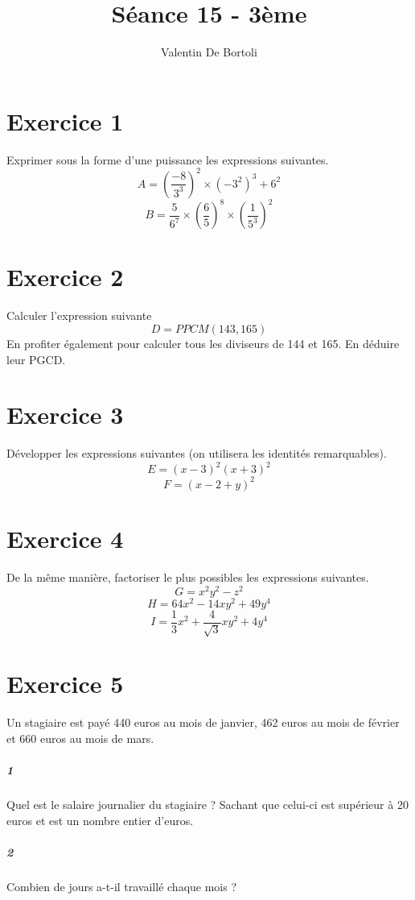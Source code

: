 \documentclass[10pt,a4paper]{article}
\title{Séance 15 - 3ème}
\author{Valentin De Bortoli}
\begin{document}
\maketitle
\section{Exercice 1}
Exprimer sous la forme d'une puissance les expressions suivantes.
\begin{equation}
A=\left( \frac{-8}{3^3}\right)^2 \times (-3^2)^3 +6^2
\end{equation}
\begin{equation}
B=\frac{5}{6^7}\times \left( \frac{6}{5} \right)^8 \times\left( \frac{1}{5^3} \right)^2
\end{equation}
\section{Exercice 2}
Calculer l'expression suivante
\begin{equation}
D=PPCM(143,165)
\end{equation}
En profiter également pour calculer tous les diviseurs de 144 et 165. En déduire leur PGCD.
\section{Exercice 3}
Développer les expressions suivantes (on utilisera les identités remarquables).
\begin{equation}
E=(x-3)^2(x+3)^2
\end{equation}
\begin{equation}
F=(x-2+y)^2
\end{equation}
\section{Exercice 4}
De la même manière, factoriser le plus possibles les expressions suivantes.
\begin{equation}
G=x^2y^2-z^2
\end{equation}
\begin{equation}
H=64x^2-14xy^2+49y^4
\end{equation}
\begin{equation}
I=\frac{1}{3}x^2+\frac{4}{\sqrt{3}}xy^2+4y^4
\end{equation}
\section{Exercice 5}
Un stagiaire est payé 440 euros au mois de janvier, 462 euros au mois de février et 660 euros au mois de mars.
\subparagraph{1}Quel est le salaire journalier du stagiaire ? Sachant que celui-ci est supérieur à 20 euros et est un nombre entier d'euros.
\subparagraph{2}Combien de jours a-t-il travaillé chaque mois ?
\end{document}
